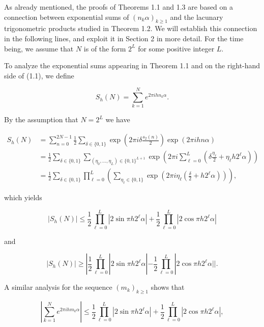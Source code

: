 \documentclass[10pt]{article}
\begin{document}
As already mentioned, the proofs of Theorems 1.1 and 1.3 are based on a connection between exponential sums of $\left(n_{k} \alpha\right)_{k \geqslant 1}$ and the lacunary trigonometric products studied in Theorem 1.2. We will establish this connection in the following lines, and exploit it in Section 2 in more detail. For the time being, we assume that $N$ is of the form $2^{L}$ for some positive integer $L$.

To analyze the exponential sums appearing in Theorem 1.1 and on the right-hand side of (1.1), we define

$$
S_{h}(N)=\sum_{k=1}^{N} e^{2 \pi i h n_{k} \alpha} .
$$

By the assumption that $N=2^{L}$ we have

$$
\begin{aligned}
S_{h}(N) & =\sum_{n=0}^{2 N-1} \frac{1}{2} \sum_{\delta \in\{0,1\}} \exp \left(2 \pi i \delta \frac{s_{2}(n)}{2}\right) \exp (2 \pi i h n \alpha) \\
& =\frac{1}{2} \sum_{\delta \in\{0,1\}} \sum_{\left(\eta_{0}, \ldots, \eta_{L}\right) \in\{0,1\}^{L+1}} \exp \left(2 \pi i \sum_{\ell=0}^{L}\left(\delta \frac{\eta_{\ell}}{2}+\eta_{\ell} h 2^{\ell} \alpha\right)\right) \\
& =\frac{1}{2} \sum_{\delta \in\{0,1\}} \prod_{\ell=0}^{L}\left(\sum_{\eta_{\ell} \in\{0,1\}} \exp \left(2 \pi i \eta_{\ell}\left(\frac{\delta}{2}+h 2^{\ell} \alpha\right)\right)\right),
\end{aligned}
$$

which yields


\begin{equation*}
\left|S_{h}(N)\right| \leqslant \frac{1}{2} \prod_{\ell=0}^{L}\left|2 \sin \pi h 2^{\ell} \alpha\right|+\frac{1}{2} \prod_{\ell=0}^{L}\left|2 \cos \pi h 2^{\ell} \alpha\right| \tag{1.16}
\end{equation*}


and


\begin{equation*}
\left|S_{h}(N)\right| \geqslant\left|\frac{1}{2} \prod_{\ell=0}^{L}\right| 2 \sin \pi h 2^{\ell} \alpha\left|-\frac{1}{2} \prod_{\ell=0}^{L}\right| 2 \cos \pi h 2^{\ell} \alpha| | . \tag{1.17}
\end{equation*}


A similar analysis for the sequence $\left(m_{k}\right)_{k \geqslant 1}$ shows that


\begin{equation*}
\left|\sum_{k=1}^{N} e^{2 \pi i h m_{k} \alpha}\right| \leqslant \frac{1}{2} \prod_{\ell=0}^{L}\left|2 \sin \pi h 2^{\ell} \alpha\right|+\frac{1}{2} \prod_{\ell=0}^{L}\left|2 \cos \pi h 2^{\ell} \alpha\right|, \tag{1.18}
\end{equation*}
\end{document}

